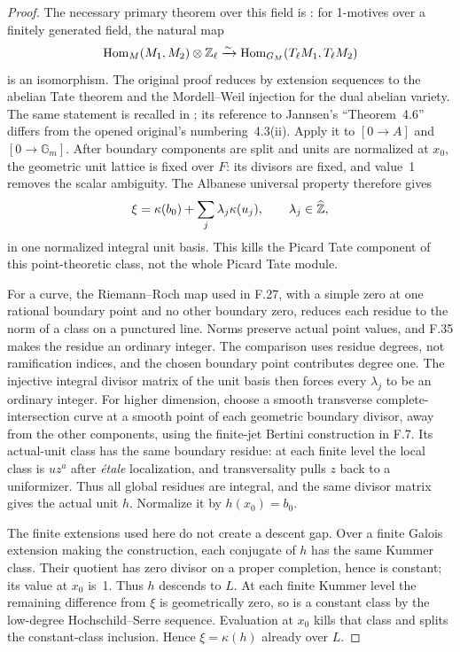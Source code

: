 \begin{proof}
The necessary primary theorem over this field is
\citet[Theorem~4.3(ii), p.~676]{F_Jannsen1995}:
for 1-motives over a finitely generated field, the natural map
\[
 \operatorname{Hom}_M(M_1,M_2)\otimes\mathbb Z_\ell
 \xrightarrow{\sim}
 \operatorname{Hom}_{G_M}(T_\ell M_1,T_\ell M_2)
\]
is an isomorphism. The original proof reduces by extension
sequences to the abelian Tate theorem and the Mordell--Weil
injection for the dual abelian variety. The same statement is
recalled in \citet[\S1.4, p.~6]{F_Jossen2014}; its reference
to Jannsen's ``Theorem~4.6'' differs from the opened original's
numbering~4.3(ii). Apply it to $[0\to A]$ and
$[0\to\mathbb G_m]$.
After boundary components are split and units are normalized
at $x_0$, the geometric unit lattice is fixed over $F$:
its divisors are fixed, and value~1 removes the scalar ambiguity.
The Albanese universal property therefore gives
\[
 \xi=\kappa(b_0)+\sum_j\lambda_j\kappa(u_j),
       \qquad\lambda_j\in\widehat{\mathbb Z},
\]
in one normalized integral unit basis. This kills the Picard
Tate component of this point-theoretic class, not the whole
Picard Tate module.

For a curve, the Riemann--Roch map used in F.27, with a simple
zero at one rational boundary point and no other boundary zero,
reduces each residue to the norm of a class on a punctured line.
Norms preserve actual point values, and F.35 makes the residue
an ordinary integer. The comparison uses residue degrees,
not ramification indices, and the chosen boundary point
contributes degree one. The injective integral divisor matrix
of the unit basis then forces every $\lambda_j$ to be an
ordinary integer.
For higher dimension, choose a smooth transverse complete-
intersection curve at a smooth point of each geometric boundary
divisor, away from the other components, using the finite-jet
Bertini construction in F.7. Its actual-unit class has the same
boundary residue: at each finite level the local class is
$u z^a$ after \emph{\'etale} localization, and transversality
pulls $z$ back to a uniformizer. Thus all global residues are
integral, and the same divisor matrix gives the actual unit $h$.
Normalize it by $h(x_0)=b_0$.

The finite extensions used here do not create a descent gap.
Over a finite Galois extension making the construction, each
conjugate of $h$ has the same Kummer class. Their quotient has
zero divisor on a proper completion, hence is constant; its
value at $x_0$ is~1. Thus $h$ descends to $L$.
At each finite Kummer level the remaining difference from $\xi$
is geometrically zero, so is a constant class by the low-degree
Hochschild--Serre sequence. Evaluation at $x_0$ kills that
class and splits the constant-class inclusion. Hence
$\xi=\kappa(h)$ already over $L$.


\end{proof}
